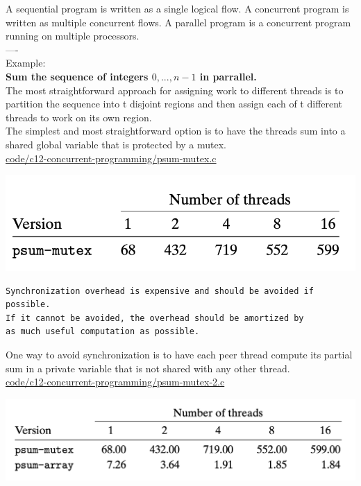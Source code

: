 \documentclass[11pt]{article}
\begin{document}
A sequential program is written as a single logical flow. A concurrent program is written as multiple concurrent flows. A parallel program is a concurrent program running on multiple processors.\\

----\\
Example:\\
\textbf{Sum the sequence of integers \(0, ..., n-1\) in parrallel.}\\

The most straightforward approach for assigning work to different threads is to partition the sequence into t disjoint regions and then assign each of t different threads to work on its own region.\\

The simplest and most straightforward option is to have the threads sum into a shared global variable that is protected by a mutex.\\


\url{code/c12-concurrent-programming/psum-mutex.c}\\

\begin{center}
\includegraphics[width=.9\linewidth]{pics/number-of-threads.png}
\end{center}

\begin{verbatim}
Synchronization overhead is expensive and should be avoided if possible.
If it cannot be avoided, the overhead should be amortized by 
as much useful computation as possible.
\end{verbatim}


One way to avoid synchronization is to have each peer thread compute its partial sum in a private variable that is not shared with any other thread.\\

\url{code/c12-concurrent-programming/psum-mutex-2.c}\\


\begin{center}
\includegraphics[width=.9\linewidth]{pics/number-of-threads-2.png}
\end{center}
\end{document}
